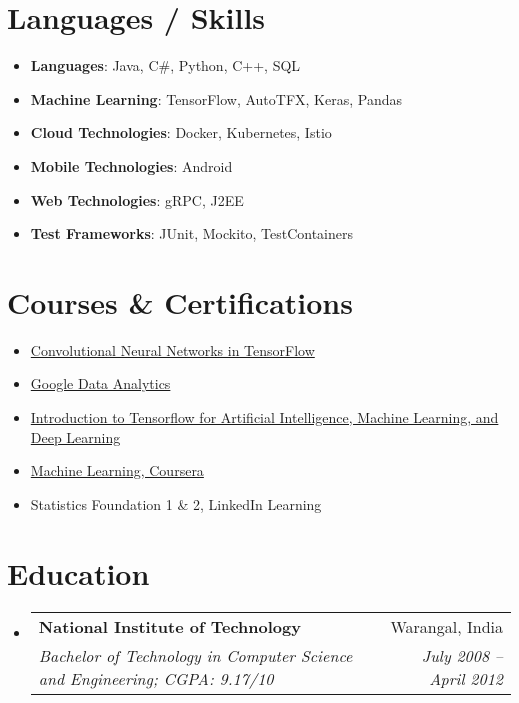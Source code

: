 \documentclass[letterpaper,11pt]{article}
\makeatletter
\newcommand{\resumeSubheading}[4]{
  \vspace{-1pt}\item[]
    \begin{tabular*}{0.97\textwidth}[t]{l@{\extracolsep{\fill}}r}
      \textbf{#1} & #2 \\
      \textit{\small#3} & \textit{\small #4} \\
    \end{tabular*}\vspace{-5pt}
}
\newcommand{\resumeSubHeadingListStart}{\begin{itemize}[leftmargin=*]}
\newcommand{\resumeSubHeadingListEnd}{\end{itemize}}
\makeatother
\begin{document}
\section{Languages / Skills}
  \resumeSubHeadingListStart
    \item{
      \textbf{Languages}{: Java, C\#, Python, C++, SQL}
    }
    \item{
      \textbf{Machine Learning}{: TensorFlow, AutoTFX, Keras, Pandas}
    }
    \item{
      \textbf{Cloud Technologies}{: Docker, Kubernetes, Istio}
    }
    \item{
      \textbf{Mobile Technologies}{: Android}
    }
    \item{
      \textbf{Web Technologies}{: gRPC, J2EE}
    }
    \item{
      \textbf{Test Frameworks}{: JUnit, Mockito, TestContainers}
    }
  \resumeSubHeadingListEnd

\section{Courses \& Certifications}
 \resumeSubHeadingListStart
 \item{
 \href{https://coursera.org/share/1dbaaf4342339a9a53bbc8d2bb9332fc}{Convolutional Neural Networks in TensorFlow}
}
\item{
\href{https://coursera.org/share/dbb7549a0d292aae7b6bdb7f4914a97c}{Google Data Analytics}
}
\item{
\href{https://coursera.org/share/cd990fdf3e32111eadc2c9635f56b539}{Introduction to Tensorflow for Artificial Intelligence, Machine Learning, and Deep Learning}}
  \item{
   \href{https://www.coursera.org/account/accomplishments/certificate/L8TAJG2CVTKR}{Machine Learning, Coursera}
  }
  \item{
  {Statistics Foundation 1 \& 2, LinkedIn Learning}
  }
 \resumeSubHeadingListEnd

\section{Education}
\resumeSubHeadingListStart
\resumeSubheading
{National Institute of Technology }{Warangal, India}
{Bachelor of Technology in Computer Science and Engineering; CGPA: 9.17/10}{July 2008 -- April 2012}
\resumeSubHeadingListEnd

\end{document}
